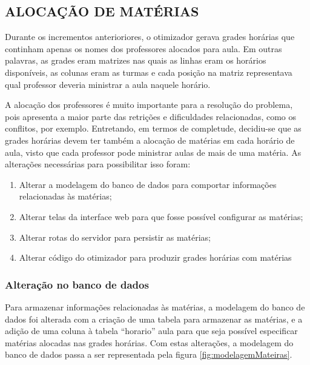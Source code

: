 \subsection{ALOCAÇÃO DE MATÉRIAS}

Durante os incrementos anterioriores, o otimizador gerava grades horárias que continham apenas os nomes dos professores alocados para aula. Em outras palavras, as grades eram matrizes nas quais as linhas eram os horários disponíveis, as colunas eram as turmas e cada posição na matriz representava qual professor deveria ministrar a aula naquele horário.

A alocação dos professores é muito importante para a resolução do problema, pois apresenta a maior parte das retrições e dificuldades relacionadas, como os conflitos, por exemplo. Entretando, em termos de completude, decidiu-se que as grades horárias devem ter também a alocação de matérias em cada horário de aula, visto que cada professor pode ministrar aulas de mais de uma matéria. As alterações necessárias para possibilitar isso foram:

\begin{enumerate}
	\item Alterar a modelagem do banco de dados para comportar informações relacionadas às matérias;
	\item Alterar telas da interface web para que fosse possível configurar as matérias;
	\item Alterar rotas do servidor para persistir as matérias;
	\item Alterar código do otimizador para produzir grades horárias com matérias
\end{enumerate}

\newpage
\subsubsection{Alteração no banco de dados}
Para armazenar informações relacionadas às matérias, a modelagem do banco de dados foi alterada com a criação de uma tabela para armazenar as matérias, e a adição de uma coluna à tabela ``horario'' aula para que seja possível especificar matérias alocadas nas grades horárias. 
Com estas alterações, a modelagem do banco de dados passa a ser representada pela figura \ref{fig:modelagemMateiras}.

